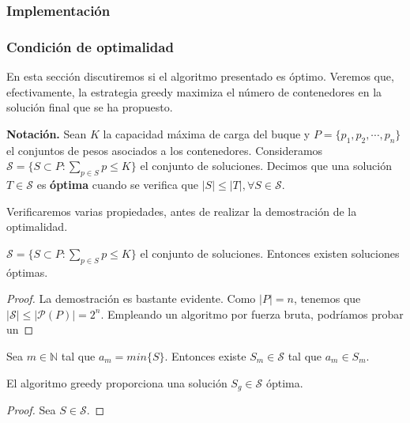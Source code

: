 \subsubsection{Implementación}



\subsubsection{Condición de optimalidad}
En esta sección discutiremos si el algoritmo presentado es óptimo. Veremos que,
efectivamente, la estrategia greedy maximiza el número de contenedores 
en la solución final que se ha propuesto. 

\textbf{Notación.} Sean $K$ la capacidad máxima de carga del buque y
$P = \{p_1,p_2,\cdots,p_n\}$ el conjuntos de pesos asociados
a los contenedores. Consideramos $\mathcal{S} = \{S \subset P : 
\sum_{p \in S} p \leq K\}$ el conjunto de soluciones. Decimos que una solución
$T \in \mathcal{S}$ es \textbf{óptima} cuando se verifica que $|S| \leq |T|,
\forall S \in \mathcal{S}$.

Verificaremos varias propiedades, antes de realizar la demostración de la optimalidad.

\begin{lemma}
    $\mathcal{S} = \{S \subset P : \sum_{p \in S} p \leq K\}$ el conjunto de soluciones. Entonces
    existen soluciones óptimas.
\end{lemma}

\begin{proof}
    La demostración es bastante evidente. Como $|P| = n$, tenemos que $|\mathcal S| \leq |\mathcal P (P)| = 2^n$. 
    Empleando un algoritmo por fuerza bruta, podríamos probar un 
\end{proof}

\begin{lemma}
    Sea $m \in \mathbb N$ tal que $a_{m} = min\{S\}$. Entonces existe $S_m \in \mathcal S$ tal que
    $a_m \in S_m$. 
\end{lemma}

\begin{proposition}
    El algoritmo greedy proporciona una solución $S_{g} \in \mathcal{S}$ óptima. 
\end{proposition}

\begin{proof}
    Sea $S \in \mathcal{S}$. 
\end{proof}

